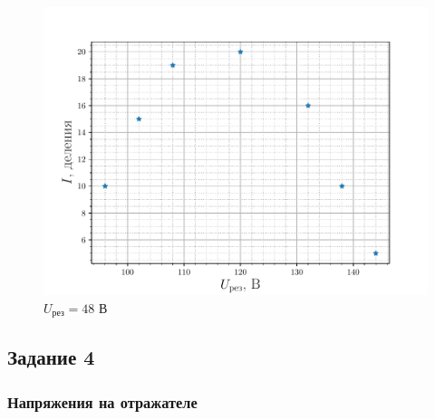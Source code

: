 \begin{figure}[H]
		\centering
		\includegraphics[height=0.4\textheight]{fig/ref48V_1}
		\caption{$U_{\text{рез}}=48$ В}
		\label{fig:ref48V_2}
\end{figure}


\subsection{Задание 4}
\subsubsection{Напряжения на отражателе}

